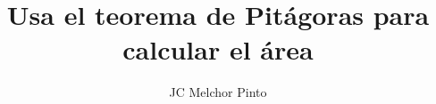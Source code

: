 \documentclass[12pt,addpoints]{guia}
\title{Usa el teorema de Pitágoras para calcular el área}
\author{JC Melchor Pinto}
\begin{document}
\INFO%
\begin{multicols}{2}
    
    
    
    \columnbreak
    
    
\end{multicols}
\ejemplosboxed[]
\begin{questions}
    \questionboxed[10]{}
    \questionboxed[10]{}
    \questionboxed[10]{}
    \ejemplosboxed[]
    \questionboxed[10]{}
    \questionboxed[15]{}
    \questionboxed[15]{}
    \questionboxed[15]{}
    \ejemplosboxed[]
    \questionboxed[15]{}
\end{questions}
\end{document}
